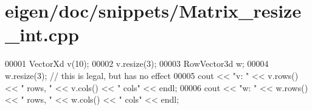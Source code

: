 \hypertarget{eigen_2doc_2snippets_2_matrix__resize__int_8cpp_source}{}\section{eigen/doc/snippets/\+Matrix\+\_\+resize\+\_\+int.cpp}
\label{eigen_2doc_2snippets_2_matrix__resize__int_8cpp_source}

\begin{DoxyCode}
00001 VectorXd v(10);
00002 v.resize(3);
00003 RowVector3d w;
00004 w.resize(3); \textcolor{comment}{// this is legal, but has no effect}
00005 cout << \textcolor{stringliteral}{"v: "} << v.rows() << \textcolor{stringliteral}{" rows, "} << v.cols() << \textcolor{stringliteral}{" cols"} << endl;
00006 cout << \textcolor{stringliteral}{"w: "} << w.rows() << \textcolor{stringliteral}{" rows, "} << w.cols() << \textcolor{stringliteral}{" cols"} << endl;
\end{DoxyCode}
